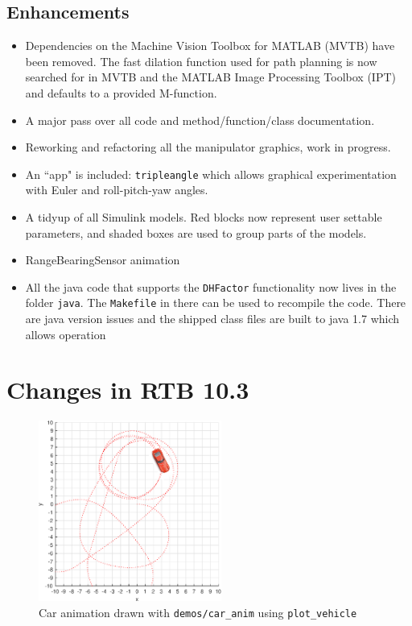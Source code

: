 \documentclass[a4paper,twoside]{report}
\begin{document}
\subsection{Enhancements}
\begin{itemize}
\item Dependencies on the Machine Vision Toolbox for MATLAB (MVTB) have been removed.  The fast dilation function used for path planning is now searched for in MVTB and the MATLAB Image Processing Toolbox (IPT) and defaults to a provided M-function.
\item A major pass over all code and method/function/class documentation.
\item Reworking and refactoring all the manipulator graphics, work in progress.
\item An ``app" is included: \texttt{tripleangle} which allows graphical experimentation with Euler and roll-pitch-yaw angles.
\item A tidyup of all Simulink models.  Red blocks now represent user settable parameters, and shaded boxes are used to group parts of the models.
\item RangeBearingSensor animation
\item All the java code that supports the \texttt{DHFactor} functionality now lives in the folder \texttt{java}.  The \texttt{Makefile} in there can be used
to recompile the code.  There are java version issues and the shipped class files are built to java 1.7 which allows operation
\end{itemize}

\section{Changes in RTB 10.3}
\begin{figure}[b]
\centering
\includegraphics[width=6cm]{figs/caranim.eps} 
\caption{Car animation drawn with \texttt{demos/car\_anim} using \texttt{plot\_vehicle}}\label{fig:caranim}
\end{figure}
\end{document}
